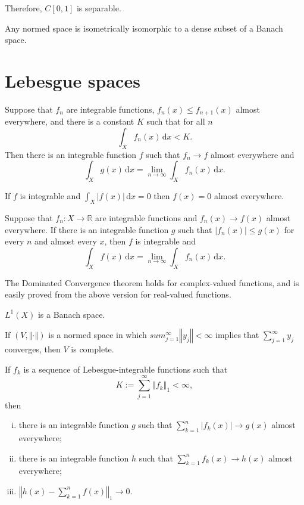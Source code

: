 \documentclass[a4paper]{article}
\newcommand{\R}{\mathbb{R}}
\newcommand{\integ}[4]{\int_{#1}^{#2}\!{#3}\,\mathrm{d}{#4}}
\newcommand{\norm}[1]{\left\Vert #1 \right\Vert}
\newcommand{\<}{\langle}
\renewcommand{\>}{\rangle}
\begin{document}
Therefore, $C[0,1]$ is separable.%

\begin{thm}
  Any normed space is isometrically isomorphic to a dense subset of a Banach space.
\end{thm}

\section{Lebesgue spaces}

\begin{thm}
  Suppose that $f_n$ are integrable functions, $f_n(x)\leq f_{n+1}(x)$ almost everywhere, and there is a constant $K$ such that for all $n$
  $$\integ{X}{}{f_n(x)}{x}<K.$$
  Then there is an integrable function $f$ such that $f_n\to f$ almost everywhere and
  $$\integ{X}{}{g(x)}{x} = \lim_{n\to\infty}\integ{X}{}{f_n(x)}{x}.$$
\end{thm}

\begin{prop}
  If $f$ is integrable and $\integ{X}{}{|f(x)|}{x}=0$ then $f(x)=0$ almost everywhere.
\end{prop}

\begin{thm}
  Suppose that $f_n:X\to\R$ are integrable functions and $f_n(x)\to f(x)$ almost everywhere. If there is an integrable function $g$ such that $|f_n(x)|\leq g(x)$ for every $n$ and almost every $x$, then $f$ is integrable and
  $$\integ{X}{}{f(x)}{x} = \lim_{n\to\infty}\integ{X}{}{f_n(x)}{x}.$$
\end{thm}

The Dominated Convergence theorem holds for complex-valued functions, and is easily proved from the above version for real-valued functions.

\begin{thm}
  $L^1(X)$ is a Banach space.
\end{thm}

\begin{lemma}
  If $(V,\norm{\cdot})$ is a normed space in which $sum_{j=1}^\infty\norm{y_j}<\infty$ implies that $\sum_{j=1}^\infty y_j$ converges, then $V$ is complete.
\end{lemma}

\begin{lemma}
  If $f_k$ is a sequence of Lebesgue-integrable functions such that
  $$ K := \sum_{j=1}^\infty\norm{f_k}_1<\infty,$$
  then
  \begin{enumerate}[(i)]
    \item there is an integrable function $g$ such that $\sum_{k=1}^n |f_k(x)| \to g(x)$ almost everywhere;
    \item there is an integrable function $h$ such that $\sum_{k=1}^n f_k(x) \to h(x)$ almost everywhere;
    \item $\norm{h(x)-\sum_{k=1}^n f(x)}_1\to0$.
  \end{enumerate}
\end{lemma}
\end{document}

